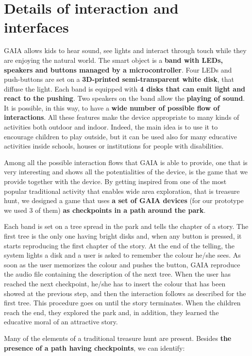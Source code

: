 \documentclass[a4paper,11pt]{report}
\begin{document}
\section{Details of interaction and interfaces}
GAIA allows kids to hear sound, see lights and interact through touch while they are enjoying the natural world. The smart object is a \textbf{band with LEDs, speakers and buttons managed by a microcontroller}. Four LEDs and push-buttons are set on a \textbf{3D-printed semi-transparent white disk}, that diffuse the light. Each band is equipped with \textbf{4 disks that can emit light and react to the pushing}. Two speakers on the band allow the \textbf{playing of sound}. It is possible, in this way, to have a \textbf{wide number of possible flow of interactions}. All these features make the device appropriate to many kinds of activities both outdoor and indoor.  Indeed, the main idea is to use it to encourage children to play outside, but it can be used also for many educative activities inside schools, houses or institutions for people with disabilities.\par
Among all the possible interaction flows that GAIA is able to provide, one that is very interesting and shows all the potentialities of the device, is the game that we provide together with the device. By getting inspired from one of the most popular traditional activity that enables wide area exploration, that is treasure hunt, we designed a game that uses \textbf{a set of GAIA devices} (for our prototype we used 3 of them) \textbf{as checkpoints in a path around the park}.\par
Each band is set on a tree spread in the park and tells the chapter of a story. The first tree is the only one having bright disks and, when any button is pressed, it starts reproducing the first chapter of the story. At the end of the telling, the system lights a disk and a user is asked to remember the colour he/she sees. As soon as the user memorizes the colour and pushes the button, GAIA reproduce the audio file containing the description of the next tree. When the user has reached the next checkpoint, he/she has to insert the colour that has been showed at the previous step, and then the interaction follows as described for the first tree. This procedure goes on until the story terminates. When the children reach the end, they explored the park and, in addition, they learned the educative moral of an attractive story.\par
Many of the elements of a traditional treasure hunt are present. Besides \textbf{the presence of a path having checkpoints}, we can identify:
\end{document}
